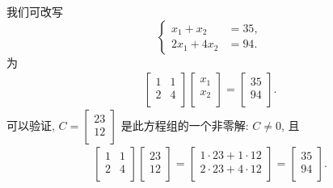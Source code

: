 \documentclass[../libro.tex]{subfiles}
\begin{document}
\begin{example}
    我们可改写
    \begin{equation*}
        \left\{ %
        \begin{aligned}
            x_1 + x_2   & = 35, \\
            2x_1 + 4x_2 & = 94.
        \end{aligned}
        \right. %
    \end{equation*}
    为
    \begin{align*}
        \begin{bmatrix}
            1 & 1 \\
            2 & 4 \\
        \end{bmatrix}
        \begin{bmatrix}
            x_1 \\
            x_2 \\
        \end{bmatrix}
        =
        \begin{bmatrix}
            35 \\
            94 \\
        \end{bmatrix}.
    \end{align*}
    可以验证,
    \(
        C =
        \begin{bmatrix}
            23 \\
            12 \\
        \end{bmatrix}
    \)
    是此方程组的一个非零解:
    \(C \neq 0\), 且
    \begin{align*}
        \begin{bmatrix}
            1 & 1 \\
            2 & 4 \\
        \end{bmatrix}
        \begin{bmatrix}
            23 \\
            12 \\
        \end{bmatrix}
        =
        \begin{bmatrix}
            1 \cdot 23 + 1 \cdot 12 \\
            2 \cdot 23 + 4 \cdot 12 \\
        \end{bmatrix}
        =
        \begin{bmatrix}
            35 \\
            94 \\
        \end{bmatrix}.
    \end{align*}


\end{example}
\end{document}
